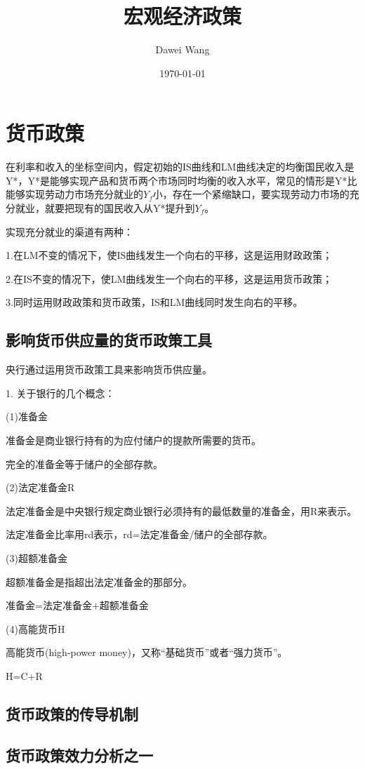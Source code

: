 \documentclass{article}
\title{宏观经济政策}
\author{Dawei Wang}
\date{\today}
\begin{document}
	\maketitle
\section{货币政策}
在利率和收入的坐标空间内，假定初始的IS曲线和LM曲线决定的均衡国民收入是Y*，Y*是能够实现产品和货币两个市场同时均衡的收入水平，常见的情形是Y*比能够实现劳动力市场充分就业的$ Y_f $小，存在一个紧缩缺口，要实现劳动力市场的充分就业，就要把现有的国民收入从Y*提升到$ Y_f $。

实现充分就业的渠道有两种：

1.在LM不变的情况下，使IS曲线发生一个向右的平移，这是运用财政政策；

2.在IS不变的情况下，使LM曲线发生一个向右的平移，这是运用货币政策；

3.同时运用财政政策和货币政策，IS和LM曲线同时发生向右的平移。

\subsection{影响货币供应量的货币政策工具}
央行通过运用货币政策工具来影响货币供应量。

1. 关于银行的几个概念：

(1)准备金

准备金是商业银行持有的为应付储户的提款所需要的货币。

完全的准备金等于储户的全部存款。

(2)法定准备金R

法定准备金是中央银行规定商业银行必须持有的最低数量的准备金，用R来表示。

法定准备金比率用rd表示，rd=法定准备金/储户的全部存款。

(3)超额准备金

超额准备金是指超出法定准备金的那部分。

准备金=法定准备金+超额准备金

(4)高能货币H

高能货币(high-power money)，又称“基础货币”或者“强力货币”。

H=C+R


\subsection{货币政策的传导机制}

\subsection{货币政策效力分析之一}
\end{document}
